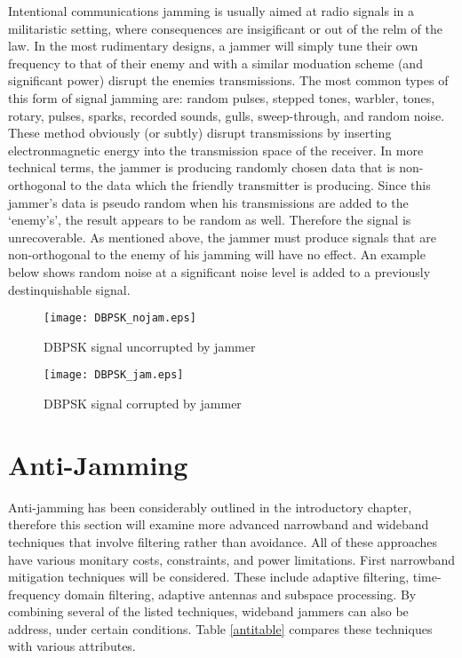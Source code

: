 Intentional communications jamming is usually aimed at radio signals in a militaristic setting, where consequences are insigificant or out of the relm of the law. In the most rudimentary designs, a jammer will simply tune their own frequency to that of their enemy and with a similar moduation scheme (and significant power) disrupt the enemies transmissions.  The most common types of this form of signal jamming are: random pulses, stepped tones, warbler, tones, rotary, pulses, sparks, recorded sounds, gulls, sweep-through, and random noise\cite{sterling}.  These method obviously (or subtly) disrupt transmissions by inserting electronmagnetic energy into the transmission space of the receiver.  In more technical terms, the jammer is producing randomly chosen data that is non-orthogonal to the data which the friendly transmitter is producing.  Since this jammer's data is pseudo random when his transmissions are added to the `enemy's', the result appears to be random as well.  Therefore the signal is unrecoverable.  As mentioned above, the jammer must produce signals that are non-orthogonal to the enemy of his jamming will have no effect.  An example below shows random noise at a significant noise level is added to a previously destinquishable signal.\\

\begin{figure}[!ht]
  \begin{minipage}[b]{0.5\linewidth}
    \centering
    \texttt{[image: DBPSK\_nojam.eps]}
    \caption{DBPSK signal uncorrupted by jammer}
    \label{fig:chapter001_dist_001}
  \end{minipage}
  \hspace{0.5cm}
  \begin{minipage}[b]{0.5\linewidth}
    \centering
    \texttt{[image: DBPSK\_jam.eps]}
    \caption{DBPSK signal corrupted by jammer}
    \label{fig:chapter001_reward_001}
  \end{minipage}
\end{figure}

\section{Anti-Jamming}

Anti-jamming has been considerably outlined in the introductory chapter, therefore this section will examine more advanced narrowband and wideband techniques that involve filtering rather than avoidance.  All of these approaches have various monitary costs, constraints, and power limitations.  First narrowband mitigation techniques will be considered.  These include adaptive filtering, time-frequency domain filtering, adaptive antennas and subspace processing.  By combining several of the listed techniques, wideband jammers can also be address, under certain conditions.  Table \ref{antitable} compares these techniques with various attributes.\\

